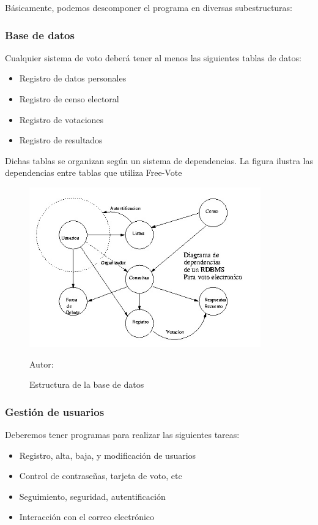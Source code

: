 Básicamente, podemos descomponer el programa en diversas subestructuras:

\subsubsection*{Base de datos}
Cualquier sistema de voto deberá tener al menos las siguientes tablas de datos:

\begin{itemize}
\item Registro de datos personales
\item Registro de censo electoral
\item Registro de votaciones
\item Registro de resultados
\end{itemize}

Dichas tablas se organizan según un sistema de dependencias. La figura ilustra las dependencias entre tablas que utiliza Free-Vote

\begin{figure}[h!]
\centering
\includegraphics[width=10cm]{Figuras/rdbms.jpg}
\caption{Estructura de la base de datos}
Autor:  
\end{figure}

\subsubsection*{Gestión de usuarios}
Deberemos tener programas para realizar las siguientes tareas:
\begin{itemize}
\item Registro, alta, baja, y modificación de usuarios
\item Control de contraseñas, tarjeta de voto, etc
\item Seguimiento, seguridad, autentificación
\item Interacción con el correo electrónico
\end{itemize}

